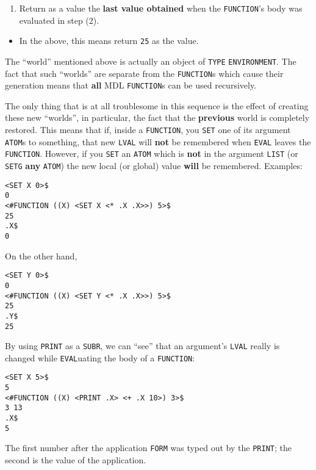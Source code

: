 \documentclass[a4paper,]{article}
\providecommand{\tightlist}{%
  \setlength{\itemsep}{0pt}\setlength{\parskip}{0pt}}
\begin{document}
\begin{enumerate}
\def\labelenumi{\arabic{enumi}.}
\setcounter{enumi}{3}
\tightlist
\item
  Return as a value the \textbf{last value obtained} when the \texttt{FUNCTION}'s body was evaluated in step (2).
\end{enumerate}

\begin{itemize}
\tightlist
\item
  In the above, this means return \texttt{25} as the value.
\end{itemize}

The ``world'' mentioned above is actually an object of \texttt{TYPE} \texttt{ENVIRONMENT}. The
fact that such ``worlds'' are separate from the \texttt{FUNCTION}s which cause their generation means that \textbf{all} MDL
\texttt{FUNCTION}s can be used recursively.

The only thing that is at all troublesome in this sequence is the effect of creating these new ``worlds'', in particular,
the fact that the \textbf{previous} world is completely restored. This means that if, inside a \texttt{FUNCTION}, you
\texttt{SET} one of its argument \texttt{ATOM}s to something, that new \texttt{LVAL} will \textbf{not} be remembered when
\texttt{EVAL} leaves the \texttt{FUNCTION}. However, if you \texttt{SET} an \texttt{ATOM} which is \textbf{not} in the
argument \texttt{LIST} (or \texttt{SETG} \textbf{any} \texttt{ATOM}) the new local (or global) value
\textbf{will} be remembered. Examples:

\begin{verbatim}
<SET X 0>$
0
<#FUNCTION ((X) <SET X <* .X .X>>) 5>$
25
.X$
0
\end{verbatim}

On the other hand,

\begin{verbatim}
<SET Y 0>$
0
<#FUNCTION ((X) <SET Y <* .X .X>>) 5>$
25
.Y$
25
\end{verbatim}

By using \texttt{PRINT} as a \texttt{SUBR}, we can ``see'' that an argument's \texttt{LVAL} really is changed while
\texttt{EVAL}uating the body of a \texttt{FUNCTION}:

\begin{verbatim}
<SET X 5>$
5
<#FUNCTION ((X) <PRINT .X> <+ .X 10>) 3>$
3 13
.X$
5
\end{verbatim}

The first number after the application \texttt{FORM} was typed out by the \texttt{PRINT}; the second is the value of the
application.
\end{document}
